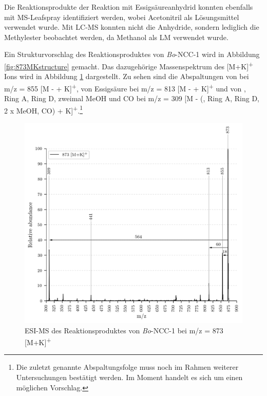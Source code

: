 \documentclass[12pt,a4paper]{article}
\begin{document}
Die Reaktionsprodukte der Reaktion mit Essigsäureanhydrid konnten ebenfalls mit MS-Leafspray identifiziert werden, wobei Acetonitril als Lösungsmittel verwendet wurde. Mit LC-MS konnten nicht die Anhydride, sondern lediglich die Methylester beobachtet werden, da Methanol als LM verwendet wurde. 

Ein Strukturvorschlag des Reaktionsproduktes von \textit{Bo}-NCC-1 wird in Abbildung \ref{fig:873MKstructure} gemacht. Das dazugehörige Massenspektrum des [M+K]\textsuperscript{+} Ions wird in Abbildung \ref{fig:873MKLeafspray} dargestellt. Zu sehen sind die Abspaltungen von  bei m/z = 855 [M -  + K]\textsuperscript{+}, von Essigsäure bei m/z = 813 [M -  + K]\textsuperscript{+} und von , Ring A, Ring D, zweimal MeOH und CO bei m/z = 309 [M - (, Ring A, Ring D, 2 x MeOH, CO) + K]\textsuperscript{+}.\footnote{Die zuletzt genannte Abspaltungsfolge muss noch im Rahmen weiterer Untersuchungen bestätigt werden. Im Moment handelt es sich um einen möglichen Vorschlag.}

\begin{figure}[htbp]
  \includegraphics[width=\textwidth, height=0.7\textwidth]{figures/Kapitel4/Kataboliten/VWA_MS_LeafSpray_873.png} 
  \caption[ESI-MS des Reaktionsproduktes von \textit{Bo}-NCC-1, Quelle: Autor]{ESI-MS des Reaktionsproduktes von \textit{Bo}-NCC-1 bei m/z = 873 [M+K]\textsuperscript{+}}
  \label{fig:873MKLeafspray}
\end{figure}
\end{document}
